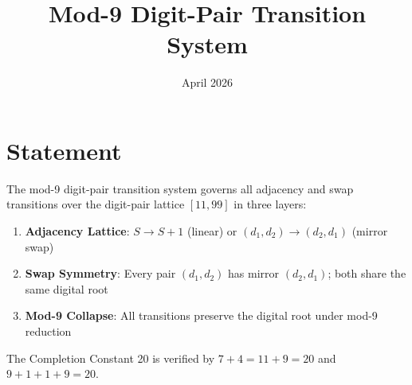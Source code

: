 \documentclass{article}
\title{Mod-9 Digit-Pair Transition System}
\date{April 2026}
\begin{document}
\maketitle

\section{Statement}

The mod-9 digit-pair transition system governs all adjacency and swap transitions over the digit-pair lattice $[11, 99]$ in three layers:

\begin{enumerate}
\item \textbf{Adjacency Lattice}: $S \to S+1$ (linear) or $(d_1,d_2) \to (d_2,d_1)$ (mirror swap)
\item \textbf{Swap Symmetry}: Every pair $(d_1,d_2)$ has mirror $(d_2,d_1)$; both share the same digital root
\item \textbf{Mod-9 Collapse}: All transitions preserve the digital root under mod-9 reduction
\end{enumerate}

The Completion Constant 20 is verified by $7+4=11+9=20$ and $9+1+1+9=20$.
\end{document}
